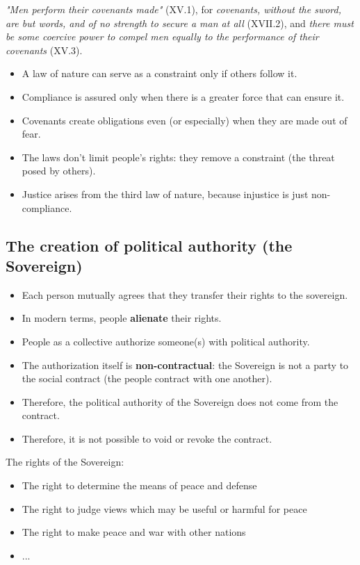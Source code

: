 \textit{"Men perform their covenants made"} (XV.1), for \textit{covenants,
without the sword, are but words, and of no strength to secure a man at all}
(XVII.2), and \textit{there must be some coercive power to compel men
equally to the performance of their covenants} (XV.3).

\begin{itemize}
    \item A law of nature can serve as a constraint only if others follow it.
    \item Compliance is assured only when there is a greater force that can
    ensure it.
    \item Covenants create obligations even (or especially) when they are made
    out of fear.
    \item The laws don't limit people's rights: they remove a constraint (the
    threat posed by others).
    \item Justice arises from the third law of nature, because injustice is
    just non-compliance.
\end{itemize}

\subsection{The creation of political authority (the Sovereign)}

\begin{itemize}
    \item Each person mutually agrees that they transfer their rights to
    the sovereign.
    \item In modern terms, people \textbf{alienate} their rights.
    \item People as a collective authorize someone(s) with political
    authority.
    \item The authorization itself is \textbf{non-contractual}: the Sovereign
    is not a party to the social contract (the people contract with one
    another).
    \item Therefore, the political authority of the Sovereign does not come
    from the contract.
    \item Therefore, it is not possible to void or revoke the contract.
\end{itemize}

The rights of the Sovereign:

\begin{itemize}
    \item The right to determine the means of peace and defense
    \item The right to judge views which may be useful or harmful for peace
    \item The right to make peace and war with other nations
    \item ...
\end{itemize}